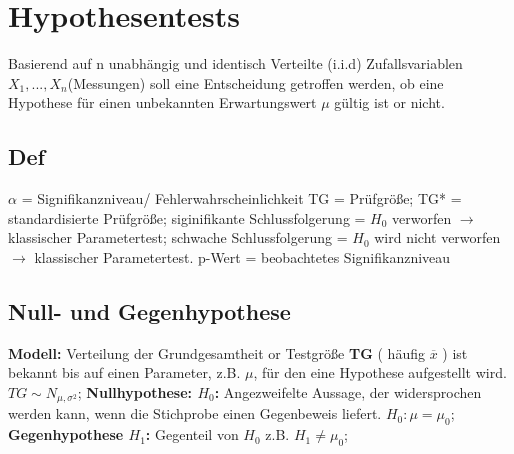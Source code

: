 \section{Hypothesentests}
Basierend auf n unabhängig und identisch Verteilte (i.i.d) Zufallsvariablen $ X_{1}, ..., X_{n} $(Messungen) soll eine Entscheidung getroffen werden, ob eine Hypothese für einen unbekannten Erwartungswert $ \mu $ gültig ist or nicht.
\subsection{Def}
$\alpha $ = Signifikanzniveau/ Fehlerwahrscheinlichkeit 
TG = Prüfgröße; 
TG* = standardisierte Prüfgröße; 
siginifikante Schlussfolgerung = $ H_{0} $ verworfen $\rightarrow$ klassischer Parametertest; 
schwache Schlussfolgerung = $ H_{0} $ wird nicht verworfen $\rightarrow$ klassischer Parametertest.
p-Wert = beobachtetes Signifikanzniveau
\subsection{Null- und Gegenhypothese}
\textbf{Modell:} Verteilung der Grundgesamtheit or Testgröße \textbf{TG} ( häufig $\overline{x}$ ) ist bekannt bis auf einen Parameter, z.B. $ \mu $, für den eine Hypothese aufgestellt wird.
$ TG \sim  N_{\mu, \sigma^2}$; 
\textbf{Nullhypothese: $ H_{0}$:} Angezweifelte Aussage, der widersprochen werden kann, wenn die Stichprobe einen Gegenbeweis liefert. $ H_{0}: \mu = \mu_{0}$; 
\textbf{Gegenhypothese $ H_{1} $:} Gegenteil von $ H_{0} $ z.B. $ H_{1} \neq \mu_{0} $;
